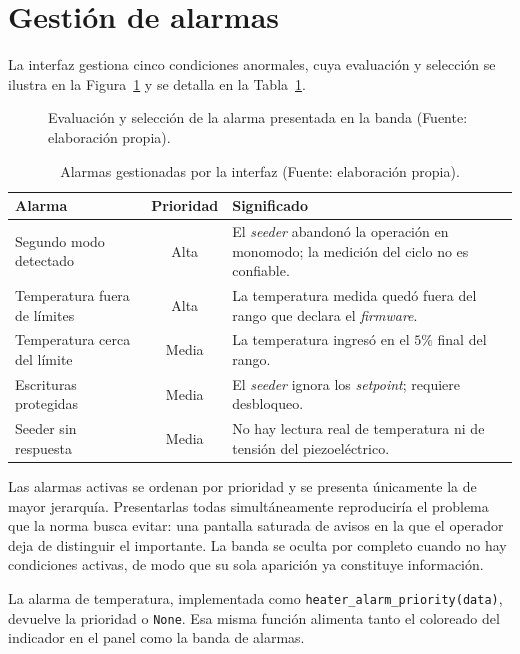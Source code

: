 \section{Gestión de alarmas}
\label{sec:hmi-alarmas}

La interfaz gestiona cinco condiciones anormales, cuya evaluación y selección se ilustra en la Figura~\ref{fig:hmi-alarmas} y se detalla en la Tabla~\ref{tab:hmi-alarmas}.

\begin{figure}[htbp]
\centering
\resizebox{\textwidth}{!}{}
\caption{Evaluación y selección de la alarma presentada en la banda (Fuente: elaboración propia).}
\label{fig:hmi-alarmas}
\end{figure}

\begin{table}[htbp]
\centering
  \begin{tabular}{@{}p{}cp{}@{}}
  \toprule
  \textbf{Alarma} & \textbf{Prioridad} & \textbf{Significado} \\
  \midrule
  Segundo modo detectado & Alta & El \emph{seeder} abandonó la operación en monomodo; la medición del ciclo no es confiable. \\
  Temperatura fuera de límites & Alta & La temperatura medida quedó fuera del rango que declara el \emph{firmware}. \\
  Temperatura cerca del límite & Media & La temperatura ingresó en el $5\%$ final del rango. \\
  Escrituras protegidas & Media & El \emph{seeder} ignora los \emph{setpoint}; requiere desbloqueo. \\
  Seeder sin respuesta & Media & No hay lectura real de temperatura ni de tensión del piezoeléctrico. \\
  \bottomrule
  \end{tabular}
  \caption{Alarmas gestionadas por la interfaz (Fuente: elaboración propia).}
  \label{tab:hmi-alarmas}
\end{table}

Las alarmas activas se ordenan por prioridad y se presenta únicamente la de mayor jerarquía. Presentarlas todas simultáneamente reproduciría el problema que la norma busca evitar: una pantalla saturada de avisos en la que el operador deja de distinguir el importante. La banda se oculta por completo cuando no hay condiciones activas, de modo que su sola aparición ya constituye información.

 La alarma de temperatura, implementada como \texttt{heater\_alarm\_priority(data)}, devuelve la prioridad o \texttt{None}. Esa misma función alimenta tanto el coloreado del indicador en el panel como la banda de alarmas.

